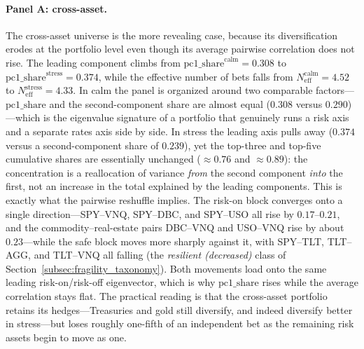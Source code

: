 \paragraph{Panel A: cross-asset.} The cross-asset universe is the more revealing case, because its diversification erodes at the portfolio level even though its average pairwise correlation does not rise. The leading component climbs from $\mathrm{pc1\_share}^{\mathrm{calm}} = 0.308$ to $\mathrm{pc1\_share}^{\mathrm{stress}} = 0.374$, while the effective number of bets falls from $N_{\mathrm{eff}}^{\mathrm{calm}} = 4.52$ to $N_{\mathrm{eff}}^{\mathrm{stress}} = 4.33$. In calm the panel is organized around two comparable factors---$\mathrm{pc1\_share}$ and the second-component share are almost equal ($0.308$ versus $0.290$)---which is the eigenvalue signature of a portfolio that genuinely runs a risk axis and a separate rates axis side by side. In stress the leading axis pulls away ($0.374$ versus a second-component share of $0.239$), yet the top-three and top-five cumulative shares are essentially unchanged ($\approx 0.76$ and $\approx 0.89$): the concentration is a reallocation of variance \emph{from} the second component \emph{into} the first, not an increase in the total explained by the leading components. This is exactly what the pairwise reshuffle implies. The risk-on block converges onto a single direction---SPY--VNQ, SPY--DBC, and SPY--USO all rise by $0.17$--$0.21$, and the commodity--real-estate pairs DBC--VNQ and USO--VNQ rise by about $0.23$---while the safe block moves more sharply against it, with SPY--TLT, TLT--AGG, and TLT--VNQ all falling (the \emph{resilient (decreased)} class of Section~\ref{subsec:fragility_taxonomy}). Both movements load onto the same leading risk-on/risk-off eigenvector, which is why $\mathrm{pc1\_share}$ rises while the average correlation stays flat. The practical reading is that the cross-asset portfolio retains its hedges---Treasuries and gold still diversify, and indeed diversify better in stress---but loses roughly one-fifth of an independent bet as the remaining risk assets begin to move as one.

